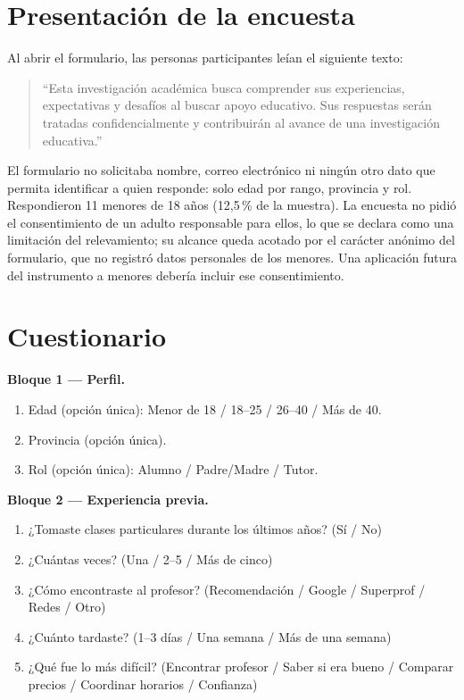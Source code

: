 \section{Presentación de la encuesta}

Al abrir el formulario, las personas participantes leían el siguiente
texto:

\begin{quote}
``Esta investigación académica busca comprender sus experiencias,
expectativas y desafíos al buscar apoyo educativo. Sus respuestas serán
tratadas confidencialmente y contribuirán al avance de una investigación
educativa.''
\end{quote}

El formulario no solicitaba nombre, correo electrónico ni ningún otro
dato que permita identificar a quien responde: solo edad por rango,
provincia y rol. Respondieron 11 menores de 18 años (12,5\,\% de la
muestra). La encuesta no pidió el consentimiento de un adulto
responsable para ellos, lo que se declara como una limitación del
relevamiento; su alcance queda acotado por el carácter anónimo del
formulario, que no registró datos personales de los menores. Una
aplicación futura del instrumento a menores debería incluir ese
consentimiento.

\section{Cuestionario}

\textbf{Bloque 1 --- Perfil.}

\begin{enumerate}
    \item Edad (opción única): Menor de 18 / 18--25 / 26--40 / Más de 40.
    \item Provincia (opción única).
    \item Rol (opción única): Alumno / Padre/Madre / Tutor.
\end{enumerate}

\textbf{Bloque 2 --- Experiencia previa.}

\begin{enumerate}[resume]
    \item ¿Tomaste clases particulares durante los últimos años? (Sí / No)
    \item ¿Cuántas veces? (Una / 2--5 / Más de cinco)
    \item ¿Cómo encontraste al profesor? (Recomendación / Google /
          Superprof / Redes / Otro)
    \item ¿Cuánto tardaste? (1--3 días / Una semana / Más de una semana)
    \item ¿Qué fue lo más difícil? (Encontrar profesor / Saber si era
          bueno / Comparar precios / Coordinar horarios / Confianza)
\end{enumerate}

